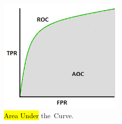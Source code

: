 \documentclass[sensors,article,accept,pdftex,moreauthors]{Definitions/mdpi}
\begin{document}
\begin{figure}[H]

	\begin{minipage}{0.48\textwidth}
		\includegraphics[width=.7\linewidth]{Definitions/AUC}
		\caption{\hl{Area Under} %
 the~Curve.}\label{fig:AUC}
	\end{minipage}
\end{figure}
\end{document}
